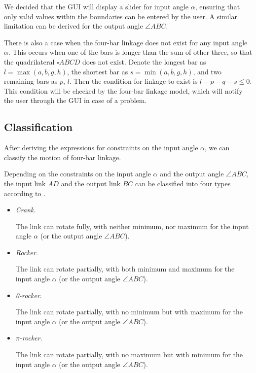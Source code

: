 \documentclass{article}
\begin{document}
 We decided that the GUI will display a slider for input angle $\alpha$, ensuring that only valid values within the boundaries can be entered by the user. A similar limitation can be derived for the output angle $\angle ABC$.
 
 There is also a case when the four-bar linkage does not exist for any input angle $\alpha$. This occurs when one of the bars is longer than the sum of other three, so that the quadrilateral $\square ABCD$ does not exist. Denote the longest bar as $l = \max(a, b, g, h)$, the shortest bar as $s = \min(a, b, g, h)$, and two remaining bars as $p$, $l$. Then the condition for linkage to exist is $l-p-q-s \le 0$. This condition will be checked by the four-bar linkage model, which will notify the user through the GUI in case of a problem.
 

 \subsection{Classification}
 
 After deriving the expressions for constraints on the input angle $\alpha$, we can classify the motion of four-bar linkage.
 
 Depending on the constraints on the input angle $\alpha$ and the output angle $\angle ABC$, the input link $AD$ and the output link $BC$ can be classified into four types according to \cite{inproceedings}.
 
 \begin{itemize}
 	\item \textit{Crank}.
 	
 	The link can rotate fully, with neither minimum, nor maximum for the input angle $\alpha$ (or the output angle $\angle ABC$).
 	
 	\item \textit{Rocker}.
 	
 	The link can rotate partially, with both minimum and maximum for the input angle $\alpha$ (or the output angle $\angle ABC$).
 	
 	\item \textit{0-rocker}.
 	
 	The link can rotate partially, with no minimum but with maximum for the input angle $\alpha$ (or the output angle $\angle ABC$).
 	
 	\item \textit{$\pi$-rocker}.
 	
 	The link can rotate partially, with no maximum but with minimum for the input angle $\alpha$ (or the output angle $\angle ABC$).
 \end{itemize}
 
\end{document}
